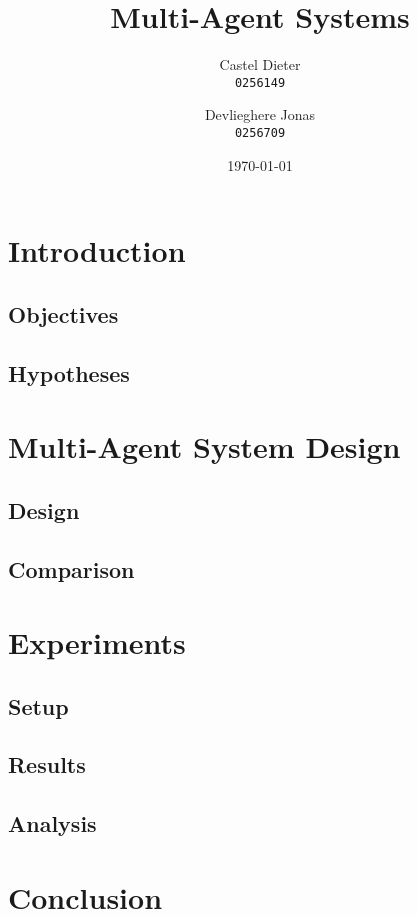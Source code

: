 \documentclass[11pt,a4paper]{article}
\title{Multi-Agent Systems}
\author{
  Castel Dieter\\
  \texttt{0256149}
  \and
  Devlieghere Jonas\\
  \texttt{0256709}
}
\date{\today}
\begin{document}
\maketitle
\tableofcontents
\listoffigures
\listoftables
\newpage

\section{Introduction}


\subsection{Objectives}


\subsection{Hypotheses}


\section{Multi-Agent System Design}

\subsection{Design}


\subsection{Comparison}


\section{Experiments}

\subsection{Setup}


\subsection{Results}


\subsection{Analysis}


\section{Conclusion}


\newpage


\nocite{*}
\end{document}
